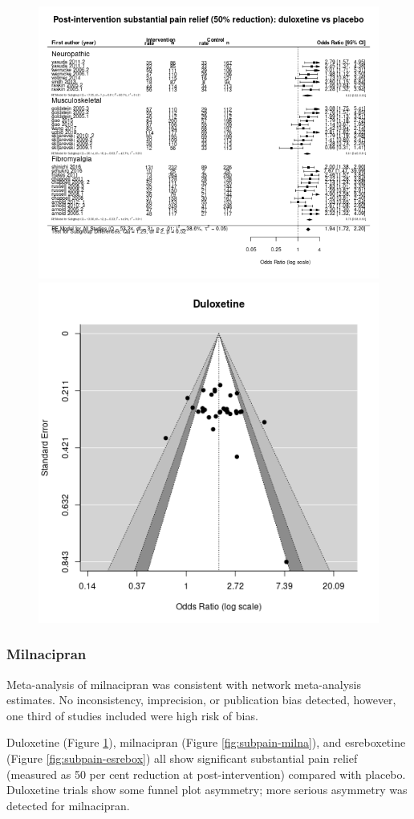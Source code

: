 \documentclass{report}\usepackage[]{graphicx}\usepackage[]{color}
\newenvironment{knitrout}{}{} %
\begin{document}
\begin{figure}

\begin{knitrout}
\color{fgcolor}
\includegraphics[width=0.5\linewidth,height=0.35\textheight]{img/pain_sub-duloxetine-placebo-forest} 
\includegraphics[width=0.5\linewidth,height=0.35\textheight]{img/pain_sub-duloxetine-placebo-funnel} 
\end{knitrout}

\caption{
%
}
\label{fig:painsub-dulox-plac}
\end{figure}


\subsubsection{Milnacipran}

Meta-analysis of milnacipran was consistent with network meta-analysis estimates. No inconsistency, imprecision, or publication bias detected, however, one third of studies included were high risk of bias.


Duloxetine (Figure \ref{fig:painsub-dulox-plac}), milnacipran (Figure \ref{fig:subpain-milna}), and esreboxetine (Figure \ref{fig:subpain-esrebox}) all show significant substantial pain relief (measured as 50 per cent reduction at post-intervention) compared with placebo. Duloxetine trials show some funnel plot asymmetry; more serious asymmetry was detected for milnacipran.
\end{document}
